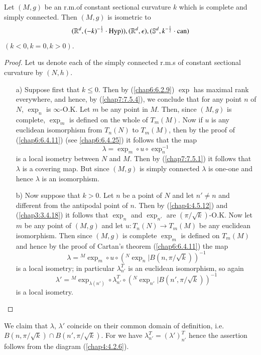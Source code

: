 \begin{prop*}
Let $(M,g)$ be an r.m.\@ of constant sectional curvature $k$ which is
complete and simply connected. Then $(M,g)$ is isometric to
$$
(\mathbb{R}^{d},(-k)^{-\frac{1}{2}}\cdot
\operatorname{Hyp})),(\mathbb{R}^{d},\epsilon),
(\mathbb{S}^{d},k^{-\frac{1}{2}}\cdot\operatorname{can})
$$
$(k<0,k=0,k>0)$.
\end{prop*}

\begin{proof}
Let us denote each of the simply connected r.m.s of constant sectional
curvature by $(N,h)$.
\begin{itemize}
\item[a)] Suppose first that $k\leq 0$. Then by (\ref{chap6:6.2.9})
  $\exp$ has maximal rank everywhere, and hence, by (\ref{chap7:7.5.4}),
  we conclude that for any point $n$ of $N$, $\exp_{n}$ is
  $\infty$-O.K. Let $m$ be any point in $M$. Then, since $(M,g)$ is
  complete, $\exp_{m}$ is defined on the whole of $T_{m}(M)$. Now if
  $u$ is any euclidean isomorphism from $T_{n}(N)$ to $T_{m}(M)$, then
  by the proof of (\ref{chap6:6.4.11}) (see \eqref{chap6:6.4.25}) it follows
  that the map
$$
\lambda=\exp_{m}\circ u\circ \exp^{-1}_{n}
$$
is \pageoriginale a local isometry between $N$ and $M$. Then by
(\ref{chap7:7.5.1}) it follows that $\lambda$ is a covering map. But
since $(M,g)$ is simply connected $\lambda$ is one-one and hence
$\lambda$ is an isomorphism.

\item[b)] Now suppose that $k>0$. Let $n$ be a point of $N$ and let
  $n'\neq n$ and different from the antipodal point of $n$. Then by
  (\ref{chap4:4.5.12}) and (\ref{chap3:3.4.18}) it follows that $\exp_{n}$ and
  $\exp_{n'}$ are $(\pi/\sqrt{k})$-O.K. Now let $m$ be any point of
  $(M,g)$ and let $u:T_{n}(N)\to T_{m}(M)$ be any euclidean
  isomorphism. Then since $(M,g)$ is complete $\exp_{m}$ is defined on
  $T_{m}(M)$ and hence by the proof of Cartan's theorem
  (\ref{chap6:6.4.11}) the map
$$
\lambda={}^{M}\exp_{m}\circ u\circ
({}^{N}\exp_{n}|B(n,\pi/\sqrt{k}))^{-1}
$$
is a local isometry; in particular $\lambda^{T}_{n'}$ is an euclidean
isomorphism, so again
$$
\lambda'={}^{M}\exp_{\lambda(n')}\circ\lambda^{T}_{n'}\circ
({}^{N}\exp_{n'}|B(n',\pi/\sqrt{k}))^{-1} 
$$
is a local isometry.
\end{itemize}
\end{proof}

We claim that $\lambda$, $\lambda'$ coincide on their common domain of
definition, i.e.\@ $B(n,\pi/\sqrt{k})\cap B(n',\pi/\sqrt{k})$. For we
have $\lambda^{T}_{n'}=(\lambda')^{T}_{n'}$ hence the assertion
follows from the diagram (\ref{chap4:4.2.6}).

